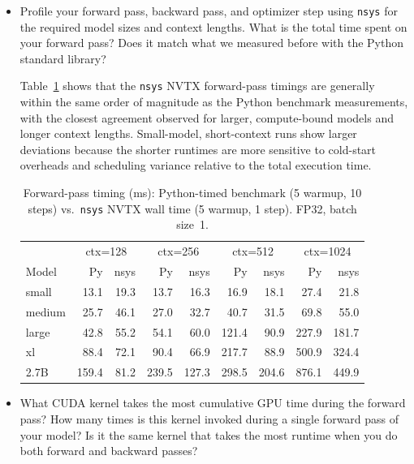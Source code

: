 \documentclass[letterpaper]{article}
\begin{document}
	\begin{itemize}
		\item[(a)] Profile your forward pass, backward pass, and optimizer step using \texttt{nsys} for the required model sizes and context lengths. What is the total time spent on your forward pass? Does it match what we measured before with the Python standard library?
		
	Table~\ref{tab:nsys-vs-python} shows that the \texttt{nsys} NVTX forward-pass timings are generally within the same order of magnitude as the Python benchmark measurements, with the closest agreement observed for larger, compute-bound models and longer context lengths. Small-model, short-context runs show larger deviations because the shorter runtimes are more sensitive to cold-start overheads and scheduling variance relative to the total execution time.
		
		\begin{table}[H]
			\centering
			\caption{Forward-pass timing (ms): Python-timed benchmark (5 warmup, 10 steps) vs.\ \texttt{nsys} NVTX wall time (5 warmup, 1 step). FP32, batch size~1.}
			\label{tab:nsys-vs-python}
			\begin{tabular}{l|rr|rr|rr|rr}
				\hline
				& \multicolumn{2}{c|}{ctx=128} & \multicolumn{2}{c|}{ctx=256} & \multicolumn{2}{c|}{ctx=512} & \multicolumn{2}{c}{ctx=1024} \\
				Model & Py & nsys & Py & nsys & Py & nsys & Py & nsys \\
				\hline
				small  &  13.1 &  19.3 &  13.7 &  16.3 &  16.9 &  18.1 &  27.4 &  21.8 \\
				medium &  25.7 &  46.1 &  27.0 &  32.7 &  40.7 &  31.5 &  69.8 &  55.0 \\
				large  &  42.8 &  55.2 &  54.1 &  60.0 & 121.4 &  90.9 & 227.9 & 181.7 \\
				xl     &  88.4 &  72.1 &  90.4 &  66.9 & 217.7 &  88.9 & 500.9 & 324.4 \\
				2.7B   & 159.4 &  81.2 & 239.5 & 127.3 & 298.5 & 204.6 & 876.1 & 449.9 \\
				\hline
			\end{tabular}
		\end{table}
		
		\item[(b)] What CUDA kernel takes the most cumulative GPU time during the forward pass? How many times is this kernel invoked during a single forward pass of your model? Is it the same kernel that takes the most runtime when you do both forward and backward passes?
		

\end{itemize}
\end{document}
